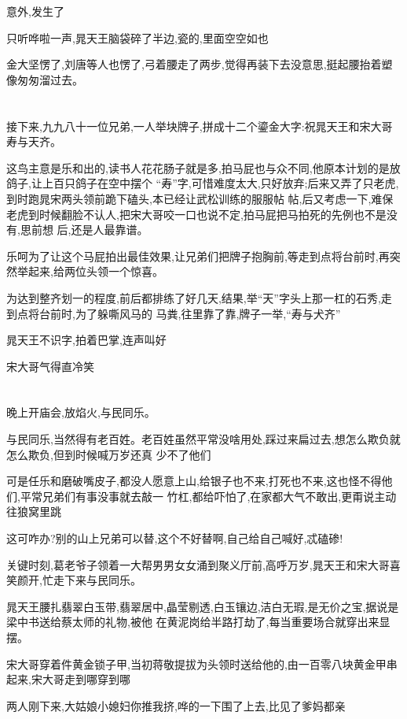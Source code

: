 ﻿\documentclass[12pt]{article}
\begin{document}
意外,发生了

只听哗啦一声,晁天王脑袋碎了半边,瓷的,里面空空如也

金大坚愣了,刘唐等人也愣了,弓着腰走了两步,觉得再装下去没意思,挺起腰抬着塑像匆匆溜过去。

\section{}

接下来,九九八十一位兄弟,一人举块牌子,拼成十二个鎏金大字:祝晁天王和宋大哥寿与天齐。

这鸟主意是乐和出的,读书人花花肠子就是多,拍马屁也与众不同,他原本计划的是放鸽子,让上百只鸽子在空中摆个
``寿''字,可惜难度太大,只好放弃;后来又弄了只老虎,到时跑晁宋两头领前跪下磕头,本已经让武松训练的服服帖
帖,后又考虑一下,难保老虎到时候翻脸不认人,把宋大哥咬一口也说不定,拍马屁把马拍死的先例也不是没有,思前想
后,还是人最靠谱。

乐呵为了让这个马屁拍出最佳效果,让兄弟们把牌子抱胸前,等走到点将台前时,再突然举起来,给两位头领一个惊喜。

为达到整齐划一的程度,前后都排练了好几天,结果,举``天''字头上那一杠的石秀,走到点将台前时,为了躲嘶风马的
马粪,往里靠了靠,牌子一举,``寿与犬齐''

晁天王不识字,拍着巴掌,连声叫好

宋大哥气得直冷笑
\section{}

晚上开庙会,放焰火,与民同乐。

与民同乐,当然得有老百姓。老百姓虽然平常没啥用处,踩过来扁过去,想怎么欺负就怎么欺负,但到时候喊万岁还真
少不了他们

可是任乐和磨破嘴皮子,都没人愿意上山,给银子也不来,打死也不来,这也怪不得他们,平常兄弟们有事没事就去敲一
竹杠,都给吓怕了,在家都大气不敢出,更甭说主动往狼窝里跳

这可咋办?别的山上兄弟可以替,这个不好替啊,自己给自己喊好,忒磕碜!

关键时刻,葛老爷子领着一大帮男男女女涌到聚义厅前,高呼万岁,晁天王和宋大哥喜笑颜开,忙走下来与民同乐。

晁天王腰扎翡翠白玉带,翡翠居中,晶莹剔透,白玉镶边,洁白无瑕,是无价之宝,据说是梁中书送给蔡太师的礼物,被他
在黄泥岗给半路打劫了,每当重要场合就穿出来显摆。

宋大哥穿着件黄金锁子甲,当初蒋敬提拔为头领时送给他的,由一百零八块黄金甲串起来,宋大哥走到哪穿到哪

两人刚下来,大姑娘小媳妇你推我挤,哗的一下围了上去,比见了爹妈都亲
\end{document}
